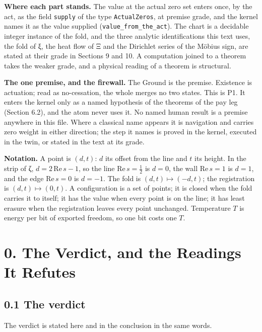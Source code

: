 \documentclass[10pt,twocolumn]{article}
\begin{document}
\textbf{Where each part stands.} The value at the actual zero set enters
once, by the act, as the field \texttt{supply} of the type
\texttt{ActualZeros}, at premise grade, and the kernel names it as the
value supplied (\texttt{value\_\allowbreak{}from\_\allowbreak{}the\_\allowbreak{}act}). The chart is a
decidable integer instance of the fold, and the three analytic
identifications this text uses, the fold of ξ, the heat flow of Ξ and
the Dirichlet series of the Möbius sign, are stated at their grade in
Sections 9 and 10. A computation joined to a theorem takes the weaker
grade, and a physical reading of a theorem is structural.

\textbf{The one premise, and the firewall.} The Ground is the premise.
Existence is actuation; read as no-cessation, the whole merges no two
states. This is P1. It enters the kernel only as a named hypothesis of
the theorems of the pay leg (Section 6.2), and the atom never uses it.
No named human result is a premise anywhere in this file. Where a
classical name appears it is navigation and carries zero weight in
either direction; the step it names is proved in the kernel, executed in
the twin, or stated in the text at its grade.

\textbf{Notation.} A point is \((d,t)\): \(d\) its offset from the line
and \(t\) its height. In the strip of ζ, \(d=2\,\mathrm{Re}\,s-1\), so
the line \(\mathrm{Re}\,s=\tfrac12\) is \(d=0\), the wall
\(\mathrm{Re}\,s=1\) is \(d=1\), and the edge \(\mathrm{Re}\,s=0\) is
\(d=-1\). The fold is \((d,t)\mapsto(-d,t)\); the registration is
\((d,t)\mapsto(0,t)\). A configuration is a set of points; it is closed
when the fold carries it to itself; it has the value when every point is
on the line; it has least erasure when the registration leaves every
point unchanged. Temperature \(T\) is energy per bit of exported
freedom, so one bit costs one \(T\).

\hypertarget{the-verdict-and-the-readings-it-refutes}{%
\section{0. The Verdict, and the Readings It
Refutes}\label{the-verdict-and-the-readings-it-refutes}}

\hypertarget{the-verdict}{%
\subsection{0.1 The verdict}\label{the-verdict}}

The verdict is stated here and in the conclusion in the same words.
\end{document}

